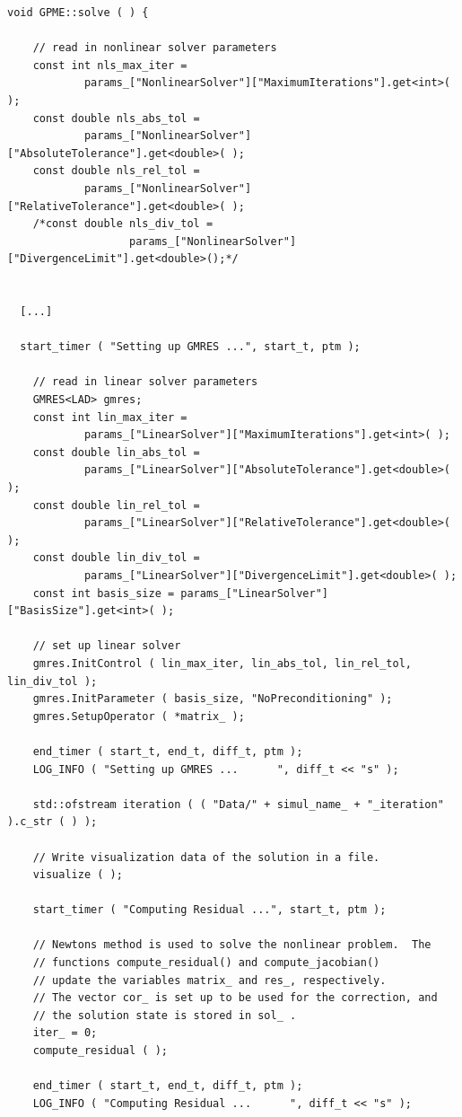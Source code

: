 \documentclass{article}
\begin{document}
\begin{lstlisting}[firstnumber=484]
void GPME::solve ( ) {

    // read in nonlinear solver parameters
    const int nls_max_iter =
            params_["NonlinearSolver"]["MaximumIterations"].get<int>( );
    const double nls_abs_tol =
            params_["NonlinearSolver"]["AbsoluteTolerance"].get<double>( );
    const double nls_rel_tol =
            params_["NonlinearSolver"]["RelativeTolerance"].get<double>( );
    /*const double nls_div_tol =
                   params_["NonlinearSolver"]["DivergenceLimit"].get<double>();*/


  [...]
 
  start_timer ( "Setting up GMRES ...", start_t, ptm );

    // read in linear solver parameters
    GMRES<LAD> gmres;
    const int lin_max_iter =
            params_["LinearSolver"]["MaximumIterations"].get<int>( );
    const double lin_abs_tol =
            params_["LinearSolver"]["AbsoluteTolerance"].get<double>( );
    const double lin_rel_tol =
            params_["LinearSolver"]["RelativeTolerance"].get<double>( );
    const double lin_div_tol =
            params_["LinearSolver"]["DivergenceLimit"].get<double>( );
    const int basis_size = params_["LinearSolver"]["BasisSize"].get<int>( );

    // set up linear solver
    gmres.InitControl ( lin_max_iter, lin_abs_tol, lin_rel_tol, lin_div_tol );
    gmres.InitParameter ( basis_size, "NoPreconditioning" );
    gmres.SetupOperator ( *matrix_ );

    end_timer ( start_t, end_t, diff_t, ptm );
    LOG_INFO ( "Setting up GMRES ...      ", diff_t << "s" );

    std::ofstream iteration ( ( "Data/" + simul_name_ + "_iteration" ).c_str ( ) );

    // Write visualization data of the solution in a file.
    visualize ( );

    start_timer ( "Computing Residual ...", start_t, ptm );

    // Newtons method is used to solve the nonlinear problem.  The
    // functions compute_residual() and compute_jacobian()
    // update the variables matrix_ and res_, respectively.
    // The vector cor_ is set up to be used for the correction, and
    // the solution state is stored in sol_ .
    iter_ = 0;
    compute_residual ( );

    end_timer ( start_t, end_t, diff_t, ptm );
    LOG_INFO ( "Computing Residual ...      ", diff_t << "s" );


\end{lstlisting}
\end{document}
